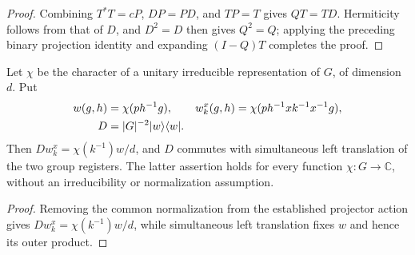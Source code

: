 \begin{proof}
    \leanok
    Combining $T^*T=cP$, $DP=PD$, and $TP=T$ gives $QT=TD$.
    Hermiticity follows from that of $D$, and $D^2=D$ then gives $Q^2=Q$;
    applying the preceding binary projection identity and expanding $(I-Q)T$
    completes the proof.
\end{proof}

\begin{lemma}
    \label{thm:peps_literal_pair_return_projection}
    \leanok
    Let $\chi$ be the character of a unitary irreducible representation of
    $G$, of dimension $d$. Put
    \begin{align}
        w(g,h) & =\chi(ph^{-1}g),\qquad
        w_k^x(g,h)=\chi(ph^{-1}xk^{-1}x^{-1}g),\notag \\
        D      & =|G|^{-2}|w\rangle\langle w|.\notag
    \end{align}
    Then $Dw_k^x=\chi(k^{-1})w/d$, and $D$ commutes with simultaneous
    left translation of the two group registers. The latter assertion
    holds for every function $\chi:G\to\mathbb C$, without an
    irreducibility or normalization assumption.
\end{lemma}

\begin{proof}
    \leanok
    Removing the common normalization from the established projector action
    gives $Dw_k^x=\chi(k^{-1})w/d$, while simultaneous left translation fixes
    $w$ and hence its outer product.
\end{proof}
